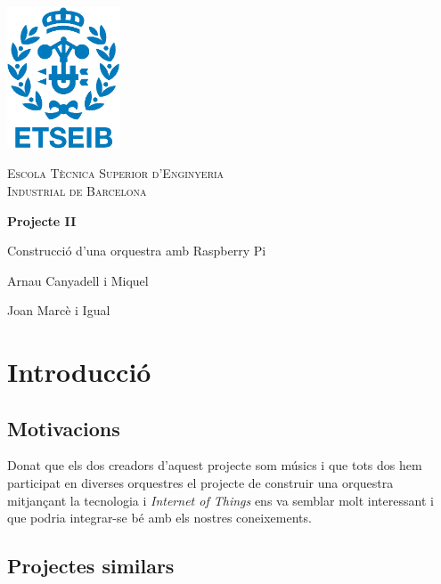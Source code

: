 \documentclass[a4paper]{paper}
\let\oldsection\section
\renewcommand\section{\clearpage\oldsection}
\begin{document}
\begin{titlepage}
	\centering
	\vspace{1cm}
	\includegraphics[width=0.25\textwidth]{images/etseib}
	\par\vspace{1cm}
	\textsc{ \LARGE Escola Tècnica Superior d'Enginyeria \\[1em] 
		Industrial de Barcelona}
	\par\vspace{2cm}
	\textbf{\LARGE Projecte II}
	\par\vspace{2cm}
	{\Huge Construcció d'una orquestra amb Raspberry Pi}
	\vfill
	\begin{flushright}
		\large
		Arnau Canyadell i Miquel \par
		Joan Marcè i Igual \par
	\end{flushright}
\end{titlepage}

\tableofcontents

\newpage

\section{Introducció}

\subsection{Motivacions}

Donat que els dos creadors d'aquest projecte som músics i que tots dos hem participat en diverses orquestres el projecte de construir una orquestra mitjançant la tecnologia i \emph{Internet of Things} ens va semblar molt interessant i que podria integrar-se bé amb els nostres coneixements.

\subsection{Projectes similars}
\end{document}
